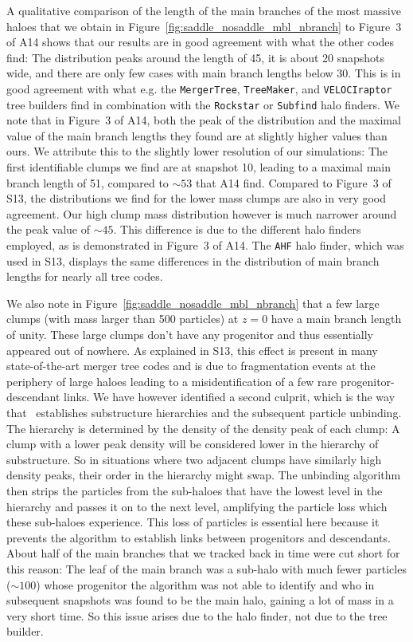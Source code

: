A qualitative comparison of the length of the main branches of the most 
massive haloes that we obtain in Figure~\ref{fig:saddle_nosaddle_mbl_nbranch} 
to Figure~3 of A14 shows that our results are in good agreement with what 
the other codes find: The distribution peaks around the length of 45, it 
is about 20 snapshots wide, and there are only few cases with main branch 
lengths below 30. This is in good agreement with what e.g. the 
\texttt{MergerTree}, \texttt{TreeMaker}, and \texttt{VELOCIraptor} tree builders
find in combination with the \texttt{Rockstar} or \texttt{Subfind} halo 
finders. We note that in Figure~3 of A14, both the peak of the
distribution and the maximal value of the main branch lengths they found are
at slightly higher values than ours. We attribute this to the slightly lower 
resolution of our simulations: The first identifiable clumps we find are at 
snapshot 10, leading to a maximal main branch length of 51, compared to 
$\sim 53$ that A14 find. Compared to Figure~3 of S13, the distributions we
find for the lower mass clumps are also in very good agreement. Our high
clump mass distribution however is much narrower around the peak value of 
$\sim 45$. This difference is due to the different halo finders employed,
as is demonstrated in Figure~3 of A14. The \texttt{AHF} halo finder, which
was used in S13, displays the same differences in the distribution of
main branch lengths for nearly all tree codes.
 
We also note in Figure~\ref{fig:saddle_nosaddle_mbl_nbranch} that a few 
large clumps (with mass larger than 500 particles) at $z=0$ have a
main branch length of unity.  These large clumps don't have any
progenitor and thus essentially appeared out of nowhere. As explained
in S13, this effect is present in many state-of-the-art merger tree 
codes and is due to fragmentation events at the periphery of large 
haloes leading to a misidentification of a few rare progenitor-descendant 
links. We have however identified a second culprit, which is the way that
\phew\ establishes substructure hierarchies and the subsequent particle
unbinding. The hierarchy is determined by the density of the density peak 
of each clump: A clump with a lower peak density will be considered lower 
in the hierarchy of substructure. So in situations where two adjacent 
clumps have similarly high density peaks, their order in the hierarchy 
might swap. The unbinding algorithm then strips the particles from the 
sub-haloes that have the lowest level in the hierarchy and passes it on to 
the next level, amplifying the particle loss which these sub-haloes 
experience. This loss of particles is essential here because it prevents 
the algorithm to establish links between progenitors and descendants. 
About half of the main branches that we tracked back in time were cut 
short for this reason: The leaf of the main branch was a sub-halo with 
much fewer particles ($\sim 100$) whose progenitor the algorithm was 
not able to identify and who in subsequent snapshots was found to be 
the main halo, gaining a lot of mass in a very short time. So this issue
arises due to the halo finder, not due to the tree builder.

